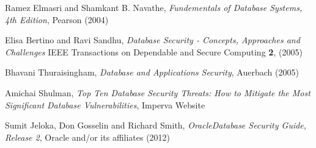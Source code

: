 \begin{thebibliography}{}

  Ramez Elmasri and Shamkant B. Navathe, {\it Fundementals of Database Systems, 4th Edition}, Pearson (2004)

  Elisa Bertino and Ravi Sandhu, {\it Database Security - Concepts, Approaches and Challenges} IEEE Transactions on Dependable and Secure Computing {\bf 2},  (2005)

  Bhavani Thuraisingham, {\it Database and Applications Security}, Auerbach (2005)

  Amichai Shulman, {\it Top Ten Database Security Threats: How to Mitigate the Most Significant Database Vulnerabilities}, Imperva Website

  Sumit Jeloka, Don Gosselin and Richard Smith, {\it Oracle\textregistered Database Security Guide, Release 2}, Oracle and/or its affiliates (2012)

\end{thebibliography}
